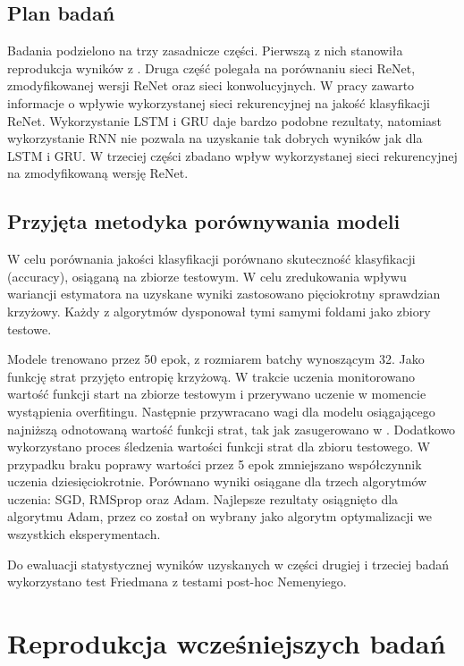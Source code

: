 \documentclass[oneside, mag]{mgr}
\begin{document}
\subsection{Plan badań}
Badania podzielono na trzy zasadnicze części. Pierwszą z nich stanowiła reprodukcja wyników z \cite{DBLP:journals/corr/VisinKCMCB15}. Druga część polegała na porównaniu sieci ReNet, zmodyfikowanej wersji ReNet oraz sieci konwolucyjnych. W pracy \cite{DBLP:journals/corr/VisinKCMCB15} zawarto informacje o wpływie wykorzystanej sieci rekurencyjnej na jakość klasyfikacji ReNet. Wykorzystanie LSTM i GRU daje bardzo podobne rezultaty, natomiast wykorzystanie RNN nie pozwala na uzyskanie tak dobrych wyników jak dla LSTM i GRU. W trzeciej części zbadano wpływ wykorzystanej sieci rekurencyjnej na zmodyfikowaną wersję ReNet.

\subsection{Przyjęta metodyka porównywania modeli}
W celu porównania jakości klasyfikacji porównano skuteczność klasyfikacji (accuracy), osiąganą na zbiorze testowym. W celu zredukowania wpływu wariancji estymatora na uzyskane wyniki zastosowano pięciokrotny sprawdzian krzyżowy. Każdy z algorytmów dysponował tymi samymi foldami jako zbiory testowe. 

Modele trenowano przez 50 epok, z rozmiarem batchy wynoszącym 32. Jako funkcję strat przyjęto entropię krzyżową. W trakcie uczenia monitorowano wartość funkcji start na zbiorze testowym i przerywano uczenie w momencie wystąpienia overfitingu. Następnie przywracano wagi dla modelu osiągającego najniższą odnotowaną wartość funkcji strat, tak jak zasugerowano w \cite{Goodfellow-et-al-2016}. Dodatkowo wykorzystano proces śledzenia wartości funkcji strat dla zbioru testowego. W przypadku braku poprawy wartości przez 5 epok zmniejszano współczynnik uczenia dziesięciokrotnie. Porównano wyniki osiągane dla trzech algorytmów uczenia: SGD, RMSprop oraz Adam. Najlepsze rezultaty osiągnięto dla algorytmu Adam, przez co został on wybrany jako algorytm optymalizacji we wszystkich eksperymentach.

Do ewaluacji statystycznej wyników uzyskanych w części drugiej i trzeciej badań wykorzystano test Friedmana z testami post-hoc Nemenyiego. 

\section{Reprodukcja wcześniejszych badań}
\end{document}
